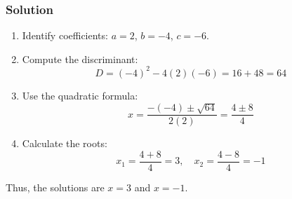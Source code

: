 \subsubsection{Solution}
\begin{enumerate}
    \item Identify coefficients: \(a = 2\), \(b = -4\), \(c = -6\).
    \item Compute the discriminant:
          \[
              D = (-4)^2 - 4(2)(-6) = 16 + 48 = 64
          \]
    \item Use the quadratic formula:
          \[
              x = \frac{-(-4) \pm \sqrt{64}}{2(2)} = \frac{4 \pm 8}{4}
          \]
    \item Calculate the roots:
          \[
              x_1 = \frac{4 + 8}{4} = 3, \quad x_2 = \frac{4 - 8}{4} = -1
          \]
\end{enumerate}
Thus, the solutions are \(x = 3\) and \(x = -1\).